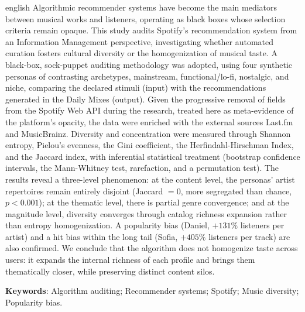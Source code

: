 \documentclass[12pt, %
openright,
oneside, %
a4paper,    %
english,   %
brazil]{facom-ufu-abntex2}
\begin{document}
\begin{resumo}[Abstract]
 \begin{otherlanguage*}{english}
   Algorithmic recommender systems have become the main mediators between
   musical works and listeners, operating as black boxes whose selection
   criteria remain opaque. This study audits Spotify's recommendation system
   from an Information Management perspective, investigating whether automated
   curation fosters cultural diversity or the homogenization of musical taste. A
   black-box, sock-puppet auditing methodology was adopted, using four synthetic
   personas of contrasting archetypes, mainstream, functional/lo-fi,
   nostalgic, and niche, comparing the declared stimuli (input) with the
   recommendations generated in the Daily Mixes (output). Given the progressive
   removal of fields from the Spotify Web API during the research, treated
   here as meta-evidence of the platform's opacity, the data were enriched
   with the external sources Last.fm and MusicBrainz. Diversity and
   concentration were measured through Shannon entropy, Pielou's evenness, the
   Gini coefficient, the Herfindahl-Hirschman Index, and the Jaccard index, with
   inferential statistical treatment (bootstrap confidence intervals, the
   Mann-Whitney test, rarefaction, and a permutation test). The results reveal a
   three-level phenomenon: at the content level, the personas' artist
   repertoires remain entirely disjoint (Jaccard $= 0$, more segregated than
   chance, $p < 0.001$); at the thematic level, there is partial genre
   convergence; and at the magnitude level, diversity converges through catalog
   richness expansion rather than entropy homogenization. A popularity bias
   (Daniel, $+131\%$ listeners per artist) and a hit bias within the long tail
   (Sofia, $+405\%$ listeners per track) are also confirmed. We conclude that the
   algorithm does not homogenize taste across users: it expands the internal
   richness of each profile and brings them thematically closer, while
   preserving distinct content silos.

   \vspace{\onelineskip}

   \noindent
   \textbf{Keywords}: Algorithm auditing; Recommender systems; Spotify; Music
   diversity; Popularity bias.
 \end{otherlanguage*}
\end{resumo}

\listoffigures*
\cleardoublepage
\end{document}
